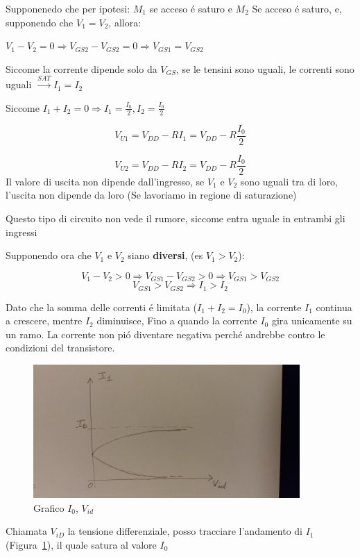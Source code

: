 Supponenedo che per ipotesi: $M_1$ se acceso \'e saturo e $M_2$ Se acceso \'e saturo, e, supponendo che $V_1 = V_2$, allora:

$V_1 - V_2 = 0 \Rightarrow V_{GS2} - V_{GS2} = 0 \Rightarrow V_{GS1} = V_{GS2} $

Siccome la corrente dipende solo da $V_{GS}$, se le tensini sono uguali, le correnti sono uguali $\xrightarrow{SAT} I_1 = I_2$

Siccome $I_1 + I_2 = 0 \Rightarrow I_1 = \frac{I_0}{2} , I_2 = \frac{I_0}{2}$

\[
    V_{U1} = V_{DD} - RI_1 = V_{DD} - R\frac{I_0 }{2}
\]

\[
    V_{U2} = V_{DD} - RI_2 = V_{DD} - R\frac{I_0 }{2}
\]
Il valore di uscita non dipende dall'ingresso, se $V_1$ e $V_2$ sono uguali tra di loro, l'uscita non dipende da loro (Se lavoriamo in regione di saturazione)

Questo tipo di circuito non vede il rumore, siccome entra uguale in entrambi gli ingressi

\vspace{20px}
Supponendo ora che $V_1$ e $V_2$ siano \textbf{diversi}, (es $V_1 > V_2$):

\[
    V_1 - V_2 > 0 \Rightarrow V_{GS1} - V_{GS2} > 0 \Rightarrow V_{GS1} > V_{GS2}
\]
\[
    V_{GS1} > V_{GS2} \Rightarrow I_1 > I_2
\]

Dato che la somma delle correnti \'e limitata ($I_1 + I_2 = I_0$), la corrente $I_1$ continua a crescere, mentre $I_2$ diminuisce, Fino a quando la corrente $I_0$ gira unicamente su un ramo. La corrente non pi\'o diventare negativa perch\'e andrebbe contro le condizioni del transistore.

\begin{figure}[ht]
    \centering
    \includegraphics[width=4in]{img/elettronica/grafico2.jpg}
    \caption{Grafico $I_0$, $V_{id}$\label{grafico_analog}}
\end{figure}

Chiamata $V_{iD}$ la tensione differenziale, posso tracciare l'andamento di $I_1$ (Figura~\ref{grafico_analog}), il quale satura al valore $I_0$

